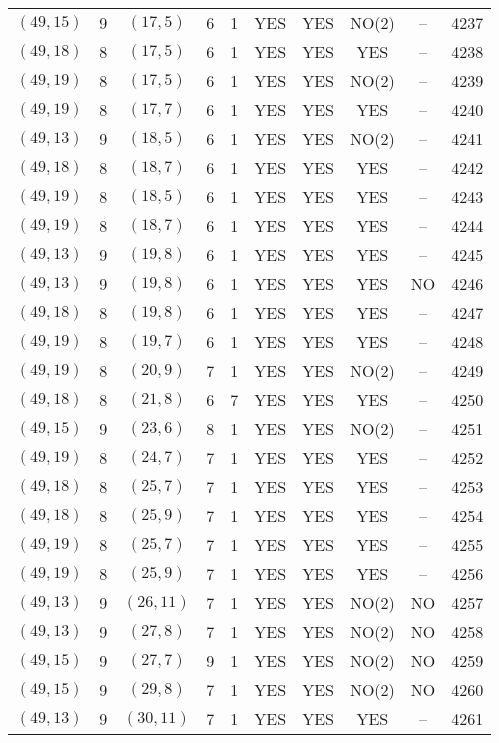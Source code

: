 \begin{longtable}{|c|c|c|c|c|c|c|c|c|c|}
$(49, 15)$ & 9 & $(17, 5)$ & 6 & 1 & YES & YES & NO(2) & -- & 4237\\
$(49, 18)$ & 8 & $(17, 5)$ & 6 & 1 & YES & YES & YES & -- & 4238\\
$(49, 19)$ & 8 & $(17, 5)$ & 6 & 1 & YES & YES & NO(2) & -- & 4239\\
$(49, 19)$ & 8 & $(17, 7)$ & 6 & 1 & YES & YES & YES & -- & 4240\\
$(49, 13)$ & 9 & $(18, 5)$ & 6 & 1 & YES & YES & NO(2) & -- & 4241\\
$(49, 18)$ & 8 & $(18, 7)$ & 6 & 1 & YES & YES & YES & -- & 4242\\
$(49, 19)$ & 8 & $(18, 5)$ & 6 & 1 & YES & YES & YES & -- & 4243\\
$(49, 19)$ & 8 & $(18, 7)$ & 6 & 1 & YES & YES & YES & -- & 4244\\
$(49, 13)$ & 9 & $(19, 8)$ & 6 & 1 & YES & YES & YES & -- & 4245\\
$(49, 13)$ & 9 & $(19, 8)$ & 6 & 1 & YES & YES & YES & NO & 4246\\
$(49, 18)$ & 8 & $(19, 8)$ & 6 & 1 & YES & YES & YES & -- & 4247\\
$(49, 19)$ & 8 & $(19, 7)$ & 6 & 1 & YES & YES & YES & -- & 4248\\
$(49, 19)$ & 8 & $(20, 9)$ & 7 & 1 & YES & YES & NO(2) & -- & 4249\\
$(49, 18)$ & 8 & $(21, 8)$ & 6 & 7 & YES & YES & YES & -- & 4250\\
$(49, 15)$ & 9 & $(23, 6)$ & 8 & 1 & YES & YES & NO(2) & -- & 4251\\
$(49, 19)$ & 8 & $(24, 7)$ & 7 & 1 & YES & YES & YES & -- & 4252\\
$(49, 18)$ & 8 & $(25, 7)$ & 7 & 1 & YES & YES & YES & -- & 4253\\
$(49, 18)$ & 8 & $(25, 9)$ & 7 & 1 & YES & YES & YES & -- & 4254\\
$(49, 19)$ & 8 & $(25, 7)$ & 7 & 1 & YES & YES & YES & -- & 4255\\
$(49, 19)$ & 8 & $(25, 9)$ & 7 & 1 & YES & YES & YES & -- & 4256\\
$(49, 13)$ & 9 & $(26, 11)$ & 7 & 1 & YES & YES & NO(2) & NO & 4257\\
$(49, 13)$ & 9 & $(27, 8)$ & 7 & 1 & YES & YES & NO(2) & NO & 4258\\
$(49, 15)$ & 9 & $(27, 7)$ & 9 & 1 & YES & YES & NO(2) & NO & 4259\\
$(49, 15)$ & 9 & $(29, 8)$ & 7 & 1 & YES & YES & NO(2) & NO & 4260\\
$(49, 13)$ & 9 & $(30, 11)$ & 7 & 1 & YES & YES & YES & -- & 4261\\

\end{longtable}
